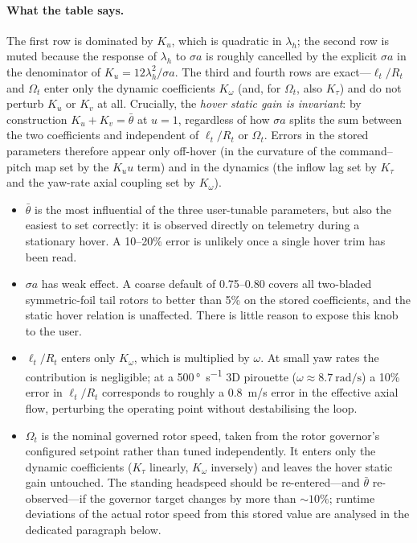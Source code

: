 \documentclass[11pt,a4paper]{article}
\newcommand{\OmegaT}{\Omega_t}
\newcommand{\Rt}{R_t}
\newcommand{\btheta}{\bar{\theta}}
\begin{document}
\paragraph{What the table says.}
The first row is dominated by \(K_u\), which is quadratic in
\(\lambda_h\); the second row is muted because the response of
\(\lambda_h\) to \(\sigma a\) is roughly cancelled by the explicit
\(\sigma a\) in the denominator of \(K_u=12\lambda_h^2/\sigma a\). The
third and fourth rows are exact---\(\ell_t/\Rt\) and \(\OmegaT\)
enter only the dynamic coefficients \(K_\omega\) (and, for \(\OmegaT\), also
\(K_\tau\)) and do not perturb \(K_u\) or \(K_v\) at all. Crucially, the
\emph{hover static gain is invariant}: by construction \(K_u+K_v=\btheta\)
at \(u=1\), regardless of how \(\sigma a\) splits the sum between the
two coefficients and independent of \(\ell_t/\Rt\) or \(\OmegaT\).
Errors in the stored parameters therefore appear only off-hover (in
the curvature of the command--pitch map set by the \(K_u u\) term) and
in the dynamics (the inflow lag set by \(K_\tau\) and the yaw-rate axial
coupling set by \(K_\omega\)).

\begin{itemize}[leftmargin=*,itemsep=4pt,topsep=2pt]
\item \(\btheta\) is the most influential of the three user-tunable
parameters, but also the easiest to set correctly: it is observed
directly on telemetry during a stationary hover. A 10--20\% error is
unlikely once a single hover trim has been read.
\item \(\sigma a\) has weak effect. A coarse default of 0.75--0.80
covers all two-bladed symmetric-foil tail rotors to better than 5\%
on the stored coefficients, and the static hover relation is
unaffected. There is little reason to expose this knob to the user.
\item \(\ell_t/\Rt\) enters only \(K_\omega\), which is multiplied by
\(\omega\). At small yaw rates the contribution is negligible; at
a 500\,\si{\degree\per\second} 3D pirouette
(\(\omega\approx\SI{8.7}{\radian\per\second}\)) a 10\% error in
\(\ell_t/\Rt\) corresponds to roughly a 0.8~m/s error in the effective
axial flow, perturbing the operating point without destabilising the
loop.
\item \(\OmegaT\) is the nominal governed rotor speed, taken from the
rotor governor's configured setpoint rather than tuned independently.
It enters only the dynamic coefficients (\(K_\tau\) linearly, \(K_\omega\)
inversely) and leaves the hover static gain untouched. The standing
headspeed should be re-entered---and \(\btheta\) re-observed---if the
governor target changes by more than \(\sim 10\%\); runtime deviations
of the actual rotor speed from this stored value are analysed in the
dedicated paragraph below.
\end{itemize}
\end{document}
